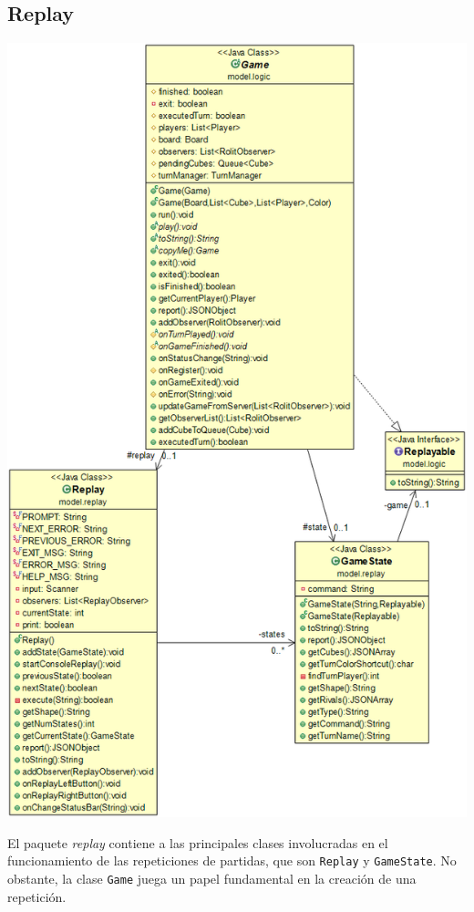 \documentclass[../DocumentoOficial.tex]{subfiles}
\begin{document}
\subsection{Replay}
\begin{center}
\includegraphics[scale=0.57]{mementoreplay.png}
\end{center}

El paquete \textit{replay} contiene a las principales clases involucradas en el funcionamiento de las repeticiones de partidas, que son \texttt{Replay} y \texttt{GameState}. No obstante, la clase \texttt{Game} juega un papel fundamental en la creación de una repetición.
\end{document}
